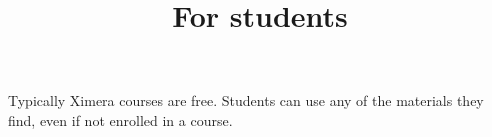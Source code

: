 \documentclass{ximera}
\title{For students}
\begin{document}
\begin{abstract}
\end{abstract}
\maketitle

Typically Ximera courses are free. 
Students can use any of the materials they find, even if not enrolled in a course.
\end{document}
